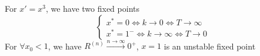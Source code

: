 \documentclass[../main/main.tex]{subfiles}
\begin{document}
For \( x' = x^3 \), we have two fixed points
\begin{equation}
  \begin{cases}
   x^* = 0 \iff k \rightarrow 0 \iff T \rightarrow \infty \\
   x^* = 1^- \iff k \rightarrow \infty  \iff T \rightarrow 0
  \end{cases}
\end{equation}
For \( \forall x_0 < 1 \), we have \( R^{(n)} \overset{n \rightarrow \infty }{\longrightarrow} 0^+ \), \( x=1 \) is an unstable fixed point    
\end{document}
